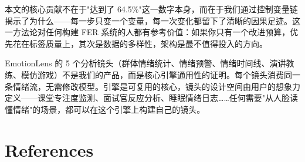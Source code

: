 \documentclass[12pt,a4paper]{article}
\begin{document}
本文的核心贡献不在于"达到了 64.5\%"这一数字本身，而在于我们通过控制变量链揭示了为什么——每一步只变一个变量，每一次变化都留下了清晰的因果足迹。这一方法论对任何构建 FER 系统的人都有参考价值：如果你只有一个改进预算，优先花在标签质量上，其次是数据的多样性，架构是最不值得投入的方向。

EmotionLens 的 5 个分析镜头（群体情绪统计、情绪预警、情绪时间线、演讲教练、模仿游戏）不是我们的产品，而是核心引擎通用性的证明。每个镜头消费同一条情绪流，无需修改模型。引擎是可复用的核心，镜头的设计空间由用户的想象力定义——课堂专注度监测、面试官反应分析、睡眠情绪日志……任何需要"从人脸读懂情绪"的场景，都可以在这个引擎上构建自己的镜头。

\section*{References}
\end{document}
